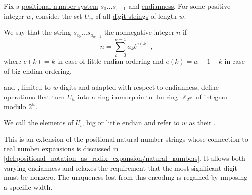 \begin{definition}\label{def:ring_of_unsigned_integers}\mimprovised
  Fix a \hyperref[def:positional_number_system]{positional number system} \( s_0 \ldots s_{b-1} \) and \hyperref[def:endianness]{endianness}. For some positive integer \( w \), consider the set \( U_w \) of all \hyperref[def:positional_number_system]{digit strings} of length \( w \).

  We say that the string \( s_{a_0} \ldots s_{a_{w-1}} \)  the nonnegative integer \( n \) if
  \begin{equation*}
    n = \sum_{k=0}^{w-1} a_k b^{e(k)},
  \end{equation*}
  where \( e(k) = k \) in case of little-endian ordering and \( e(k) = w - 1 - k \) in case of big-endian ordering.

   and , limited to \( w \) digits and adapted with respect to endianness, define operations that turn \( U_w \) into a \hyperref[def:ring]{ring} \hyperref[def:algebra_over_semiring/homomorphism]{isomorphic} to the ring \hyperref[def:ring_of_integers_modulo]{\( \BbbZ_{2^w} \)} of integers modulo \( 2^w \).

  We call the elements of \( U_w \) big or little endian  and refer to \( w \) as their .
\end{definition}
\begin{comments}
  \item This is an extension of the positional natural number strings whose connection to real number expansions is discussed in \cref{def:positional_notation_as_radix_expansion/natural_numbers}. It allows both varying endianness and relaxes the requirement that the most significant digit must be nonzero. The uniqueness lost from this encoding is regained by imposing a specific width.
\end{comments}
